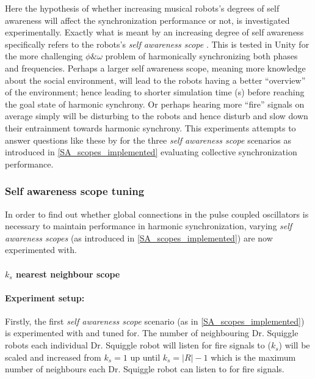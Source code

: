 	Here the hypothesis of whether increasing musical robots's degrees of self awareness will affect the synchronization performance or not, is investigated experimentally. Exactly what is meant by an increasing degree of self awareness specifically refers to the robots's \textit{self awareness scope} \cite{sacs17_ch3}. This is tested in Unity for the more challenging $\phi \& \omega$ problem of harmonically synchronizing both phases and frequencies. Perhaps a larger self awareness scope, meaning more knowledge about the social environment, will lead to the robots having a better ``overview'' of the environment; hence leading to shorter simulation time (s) before reaching the goal state of harmonic synchrony. Or perhaps hearing more ``fire'' signals on average simply will be disturbing to the robots and hence disturb and slow down their entrainment towards harmonic synchrony. This experiments attempts to answer questions like these by for the three \textit{self awareness scope} scenarios as introduced in \ref{SA_scopes_implemented} evaluating collective synchronization performance.
	
	
		\subsubsection{Self awareness scope tuning}
		\label{phase_sync_SA_scopes_tuning}

		In order to find out whether global connections in the pulse coupled oscillators is necessary to maintain performance in harmonic synchronization, varying \textit{self awareness scopes} (as introduced in \ref{SA_scopes_implemented}) are now experimented with.
		
			\paragraph{$k_s$ nearest neighbour scope\nl}
			
				\paragraph{Experiment setup:\nl}
				
				Firstly, the first \textit{self awareness scope} scenario (as in \ref{SA_scopes_implemented}) is experimented with and tuned for. The number of neighbouring Dr. Squiggle robots each individual Dr. Squiggle robot will listen for fire signals to ($k_s$) will be scaled and increased from $k_s=1$ up until $k_s=|R|-1$ which is the maximum number of neighbours each Dr. Squiggle robot can listen to for fire signals.

